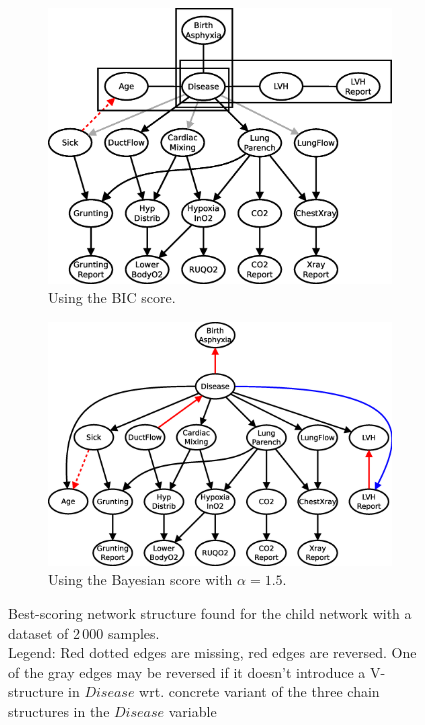 \documentclass[english,cover]{fitthesis} %
\begin{document}
\begin{figure}[ht]
    \centering
    \begin{subfigure}[b]{0.45\linewidth}
        \hspace{-2.3cm}
        \includegraphics[scale=0.37]{fig/structure-learning-child-2000-bic}
        \caption{Using the BIC score.}
        \label{fig:structure-learning-child-2000-bic}
    \end{subfigure}
    \begin{subfigure}[b]{0.45\linewidth}
        \hspace{-0.7cm}
        \includegraphics[scale=0.37]{fig/structure-learning-child-2000-bayes-1_5}
        \caption{Using the Bayesian score with $\alpha = 1.5$.}
        \label{fig:structure-learning-child-2000-bayes-1_5}
    \end{subfigure}
    \caption{Best-scoring network structure found for the child network with a dataset of 2\,000 samples.
    \\Legend: Red dotted edges are missing, red edges are reversed. One of the gray edges may be reversed if it doesn't introduce a V-structure in $Disease$ wrt. concrete variant of the three chain structures in the $Disease$ variable}
\end{figure}
\end{document}
